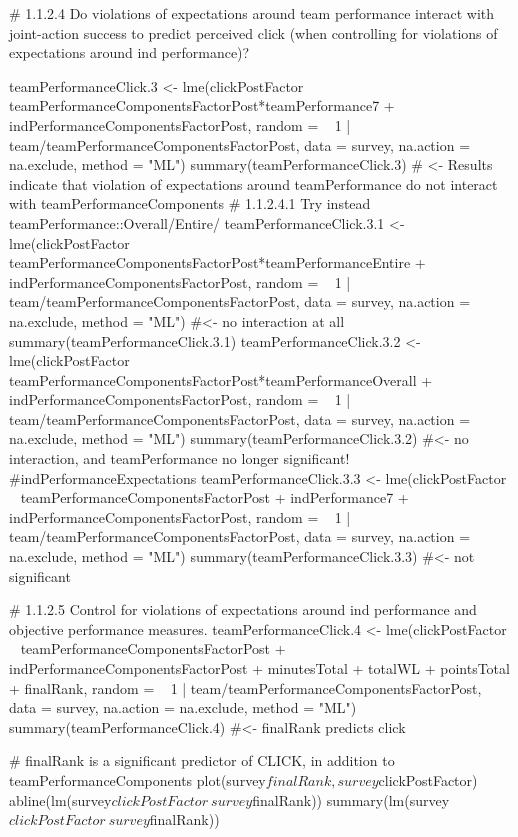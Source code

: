 #             1.1.2.4 Do violations of expectations around team performance interact with joint-action success to predict perceived click (when controlling for violations of expectations around ind performance)?

teamPerformanceClick.3 <- lme(clickPostFactor ~ teamPerformanceComponentsFactorPost*teamPerformance7 +  indPerformanceComponentsFactorPost, random = ~ 1 | team/teamPerformanceComponentsFactorPost,
                              data = survey, na.action = na.exclude, method = "ML")
summary(teamPerformanceClick.3) # <- Results indicate that violation of expectations around teamPerformance do not interact with teamPerformanceComponents
#                           1.1.2.4.1 Try instead teamPerformance::Overall/Entire/
teamPerformanceClick.3.1 <- lme(clickPostFactor ~ teamPerformanceComponentsFactorPost*teamPerformanceEntire +  indPerformanceComponentsFactorPost, random = ~ 1 | team/teamPerformanceComponentsFactorPost,
                              data = survey, na.action = na.exclude, method = "ML")  #<- no interaction at all
summary(teamPerformanceClick.3.1)
teamPerformanceClick.3.2 <- lme(clickPostFactor ~ teamPerformanceComponentsFactorPost*teamPerformanceOverall +  indPerformanceComponentsFactorPost, random = ~ 1 | team/teamPerformanceComponentsFactorPost,
                                data = survey, na.action = na.exclude, method = "ML")
summary(teamPerformanceClick.3.2)  #<- no interaction, and teamPerformance no longer significant!
#indPerformanceExpectations
teamPerformanceClick.3.3 <- lme(clickPostFactor ~ teamPerformanceComponentsFactorPost + indPerformance7 +  indPerformanceComponentsFactorPost, random = ~ 1 | team/teamPerformanceComponentsFactorPost,
                                data = survey, na.action = na.exclude, method = "ML")
summary(teamPerformanceClick.3.3) #<- not significant




#             1.1.2.5 Control for violations of expectations around ind performance and objective performance measures.
teamPerformanceClick.4 <- lme(clickPostFactor ~ teamPerformanceComponentsFactorPost  +  indPerformanceComponentsFactorPost + minutesTotal + totalWL + pointsTotal + finalRank,
                              random = ~ 1 | team/teamPerformanceComponentsFactorPost, data = survey, na.action = na.exclude, method = "ML")
summary(teamPerformanceClick.4)  #<- finalRank predicts click

# finalRank is a significant predictor of CLICK, in addition to teamPerformanceComponents
plot(survey$finalRank, survey$clickPostFactor)
abline(lm(survey$clickPostFactor ~ survey$finalRank))
summary(lm(survey$clickPostFactor ~ survey$finalRank))

